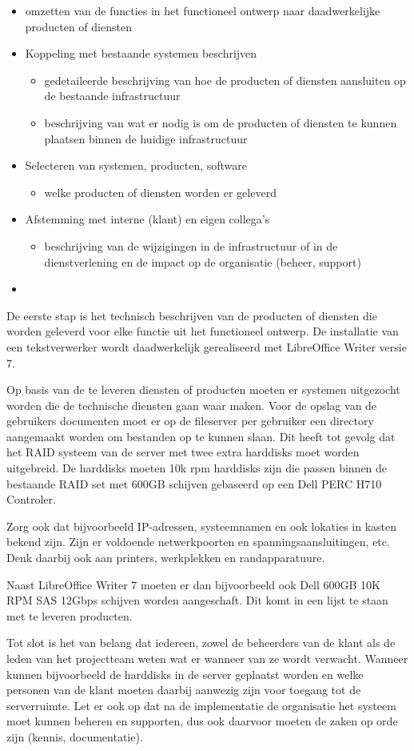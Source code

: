 
\begin{itemize}
\item omzetten van de functies in het functioneel ontwerp naar daadwerkelijke producten of diensten
\item Koppeling met bestaande systemen beschrijven
	\begin{itemize}
	\item gedetaileerde beschrijving van hoe de producten of diensten aansluiten op de bestaande infrastructuur
	\item beschrijving van wat er nodig is om de producten of diensten te kunnen plaatsen binnen de huidige infrastructuur
	\end{itemize}
\item Selecteren van systemen, producten, software
	\begin{itemize}
	\item welke producten of diensten worden er geleverd
	\end{itemize}
\item Afstemming met interne (klant) en eigen collega's
	\begin{itemize}
	\item beschrijving van de wijzigingen in de infrastructuur of in de dienstverlening en de impact op de organisatie (beheer, support)
	\end{itemize}
\item 
\end{itemize}

De eerste stap is het technisch beschrijven van de producten of diensten die worden geleverd voor elke functie uit het functioneel ontwerp. De installatie van een tekstverwerker wordt daadwerkelijk gerealiseerd met LibreOffice Writer versie 7.

Op basis van de te leveren diensten of producten moeten er systemen uitgezocht worden die de technische diensten gaan waar maken. Voor de opslag van de gebruikers documenten moet er op de fileserver per gebruiker een directory aangemaakt worden om bestanden op te kunnen slaan. Dit heeft tot gevolg dat het RAID systeem van de server met twee extra harddisks moet worden uitgebreid. De harddisks moeten 10k rpm harddisks zijn die passen binnen de bestaande RAID set met 600GB schijven gebaseerd op een Dell PERC H710 Controler.

Zorg ook dat bijvoorbeeld IP-adressen, systeemnamen en ook lokaties in kasten bekend zijn. Zijn er voldoende netwerkpoorten en spanningsaansluitingen, etc. Denk daarbij ook aan printers, werkplekken en randapparatuure.

Naast LibreOffice Writer 7 moeten er dan bijvoorbeeld ook Dell 600GB 10K RPM SAS 12Gbps schijven worden aangeschaft. Dit komt in een lijst te staan met te leveren producten.

Tot slot is het van belang dat iedereen, zowel de beheerders van de klant als de leden van het projectteam weten wat er wanneer van ze wordt verwacht. Wanneer kunnen bijvoorbeeld de harddisks in de server geplaatst worden en welke personen van de klant moeten daarbij aanwezig zijn voor toegang tot de serverruimte. Let er ook op dat na de implementatie de organisatie het systeem moet kunnen beheren en supporten, dus ook daarvoor moeten de zaken op orde zijn (kennis, documentatie).
